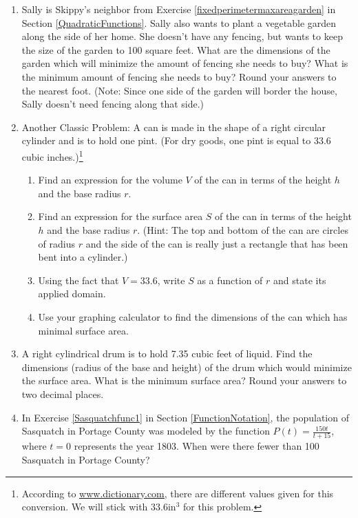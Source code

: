 \begin{enumerate}
\item \label{fixedareaminperimetergarden} Sally is Skippy's neighbor from Exercise \ref{fixedperimetermaxareagarden} in Section \ref{QuadraticFunctions}.   Sally also wants to plant a vegetable garden along the side of her home.  She doesn't have any fencing, but wants to keep the size of the garden to 100 square feet.  What are the dimensions of the garden which will minimize the amount of fencing she needs to buy?  What is the minimum amount of fencing she needs to buy? Round your answers to the nearest foot. (Note:  Since one side of the garden will border the house, Sally doesn't need fencing along that side.)



\item Another Classic Problem: A can is made in the shape of a right circular cylinder and is to hold one pint. (For dry goods, one pint is equal to $33.6$ cubic inches.)\footnote{According to \href{http://dictionary.reference.com/browse/pint}{\underline{www.dictionary.com}}, there are different values given for this conversion.  We will stick with $33.6 \mbox{in}^{3}$ for this problem.}  

\begin{enumerate}

\item Find an expression for the volume $V$ of the can in terms of the height $h$ and the base radius $r$.
\item Find an expression for the surface area $S$ of the can in terms of the height $h$ and the base radius $r$.  (Hint: The top and bottom of the can are circles of radius $r$ and the side of the can is really just a rectangle that has been bent into a cylinder.)
\item Using the fact that $V = 33.6$, write $S$ as a function of $r$ and state its applied domain.
\item Use your graphing calculator to find the dimensions of the can which has minimal surface area.

\end{enumerate}

\item  A right cylindrical drum is to hold 7.35 cubic feet of liquid.  Find the dimensions (radius of the base and height) of the drum which would minimize the surface area.  What is the minimum surface area?  Round your answers to two decimal places.


\item In Exercise \ref{Sasquatchfunc1} in Section \ref{FunctionNotation}, the population of Sasquatch in Portage County was modeled by the function $P(t) = \frac{150t}{t + 15}$, where $t = 0$ represents the year 1803.  When were there fewer than 100 Sasquatch in Portage County?

\setcounter{HW}{\value{enumi}}
\end{enumerate}


